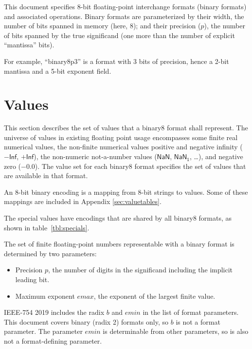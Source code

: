 \documentclass{article}
\begin{document}
This document specifies 8-bit floating-point interchange formats (binary formats) and associated operations.
Binary formats are parameterized by their width, the number of bits spanned in memory (here, 8); and their precision ($p$), the number of bits spanned by the true significand (one more than the number of explicit “mantissa” bits).


For example, ``binary8p3'' is a format with 3 bits of precision, hence a 2-bit mantissa and a 5-bit exponent field.

\clearpage
\section{Values}
\def\val#1{$\mathsf{#1}$}
\def\code#1{$\mathtt{#1}$}

This section describes the set of values that a binary8 format shall represent.
The universe of values in existing floating point usage encompasses some finite real numerical values,
the non-finite numerical values positive and negative infinity (\val{-Inf}, \val{+Inf}),
the non-numeric not-a-number values (\val{NaN}, \val{NaN_1}, …),
and negative zero ($-0.0$).
The value set for each binary8 format specifies the set of values that are available in that format. 

An 8-bit binary encoding is a mapping from 8-bit strings to values. Some of these mappings are included in Appendix \ref{sec:valuetables}.  

The special values have encodings that are shared by all binary8 formats, as shown in table~\ref{tbl:specials}.

\def\emax{\ensuremath{\mathit{emax}}\xspace}
The set of finite floating-point numbers representable with a binary format is determined by two parameters:
\begin{itemize}
\item Precision $p$, the number of digits in the significand including the implicit leading bit.
\item Maximum exponent \emax, the exponent of the largest finite value.
\end{itemize}
IEEE-754 2019 includes the radix $b$ and $\mathit{emin}$ in the list of format parameters.
This document covers binary (radix 2) formats only, so $b$ is not a format parameter.
The parameter $\mathit{emin}$ is determinable from other parameters, so is also not a format-defining parameter.
\end{document}
